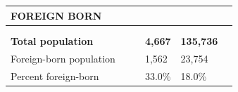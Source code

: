 \documentclass[9pt]{report}
\begin{document}
\newpage
\setlength{\tabcolsep}{.01in} %
\begin{tabular}{p{.10in}p{.10in}p{.10in}p{3.7in}>{\hfill}p{.85in}>{\hfill}p{.85in}>{\hfill}p{.85in}>{\hfill}p{.85in}p{0.1in}}
\multicolumn{9}{l}{\parbox{7.1in}{\raggedright{\large{\strut\textbf{FOREIGN BORN}\strut}}}} \\ 
\hline
\multicolumn{4}{l}{\parbox{3.5in}{\raggedright{\textbf{}}}} & \multicolumn{1}{r}{\parbox{.85in}{\strut\raggedleft{\textbf{}\strut}}} & \multicolumn{1}{r}{\parbox{.85in}{\strut\raggedleft{\textbf{}\strut}}} & \multicolumn{1}{r}{\parbox{.85in}{\strut{}}} & \multicolumn{1}{r}{\parbox{.85in}{\strut{}}} & \\ 
\multicolumn{9}{l}{} \\ 
\multicolumn{4}{l}{\parbox{3.5in}{\strut\raggedright{\textbf{Total population}\strut}}} & \textbf{} & \textbf{} & \textbf{4,667} & \textbf{135,736} & \textbf{} \\ 
\multicolumn{4}{l}{\parbox{3.6in}{\strut\raggedright{{Foreign-born population}}\strut}} &  &  & 1,562 & 23,754 & \multicolumn{1}{l}{}  \\ 
\multicolumn{4}{l}{\parbox{3.6in}{\strut\raggedright{{Percent foreign-born}}\strut}} &  &  & 33.0\% & 18.0\% & \multicolumn{1}{l}{}  \\ 

\end{tabular}
\setlength{\tabcolsep}{6pt} %
\end{document}

